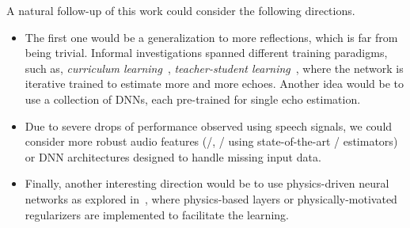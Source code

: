 \mynewline
A natural follow-up of this work could consider the following directions.
\begin{itemize}
    \item The first one would be a generalization to more reflections, which is far from being trivial.
    Informal investigations spanned different training paradigms, such as, \textit{curriculum learning}~, \textit{teacher-student learning}~, where the network is iterative trained to estimate more and more echoes.
    Another idea would be to use a collection of \acp{DNN}, each pre-trained for single echo estimation.
    \item Due to severe drops of performance observed using speech signals, we could consider more robust audio features (\eg/, \ReTF/ using state-of-the-art \ReTF/ estimators) or
    \ac{DNN} architectures designed to handle missing input data.
    \item Finally, another interesting direction would be to use physics-driven neural networks as explored in~,
    where physics-based layers or physically-motivated regularizers are implemented to facilitate the learning.
\end{itemize}

